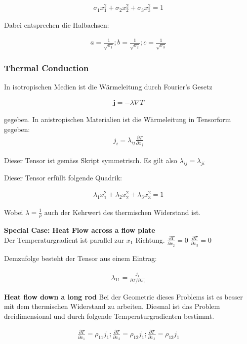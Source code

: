 \documentclass[a4paper]{scrartcl}
\begin{document}
\begin{align}
\sigma_1x_1^2+\sigma_2x_2^2+\sigma_3x_3^2=1
\end{align}


Dabei entsprechen die Halbachsen:

\begin{align}
a=\frac{1}{\sqrt{\sigma_1}}; b=\frac{1}{\sqrt{\sigma_2}};
c=\frac{1}{\sqrt{\sigma_3}}
\end{align}

\subsubsection{Thermal Conduction}
In isotropischen Medien ist die Wärmeleitung durch Fourier's Gesetz

\begin{align}
\mathbf{j}=-\lambda \nabla T
\end{align}

gegeben. In anistropischen Materialien ist die Wärmeleitung in Tensorform
gegeben:
\begin{align}
j_i=\lambda_{ij}\frac{\partial T}{\partial x_j}
\end{align}

Dieser Tensor ist gemäss Skript symmetrisch. Es gilt also
$\lambda_{ij}=\lambda_{ji}$

Dieser Tensor erfüllt folgende Quadrik:

\begin{align}
\lambda_1 x_1^2+\lambda_2 x_2^2+\lambda_3 x_3^2=1
\end{align}

Wobei $\lambda=\frac{1}{\rho}$ auch der Kehrwert des thermischen Widerstand ist.

\textbf{Special Case: Heat Flow across a flow plate} \\
Der Temperaturgradient ist parallel zur $x_1$ Richtung. $\frac{\partial
T}{\partial x_2}=0$ $\frac{\partial T}{\partial x_3}=0$

Demzufolge besteht der Tensor aus einem Eintrag:

\begin{align}
\lambda_{11}=\frac{j_1}{\partial T/ \partial x_1}
\end{align}

\textbf{Heat flow down a long rod}
Bei der Geometrie dieses Problems ist es besser mit dem thermischen Widerstand
zu arbeiten. Diesmal ist das Problem dreidimensional und durch folgende
Temperaturgradienten bestimmt.

\begin{align}
\frac{\partial T}{\partial x_1}=\rho_{11}j_1; \frac{\partial T}{\partial
x_2}=\rho_{12}j_1; \frac{\partial T}{\partial x_3}=\rho_{13}j_1
\end{align}
\end{document}
